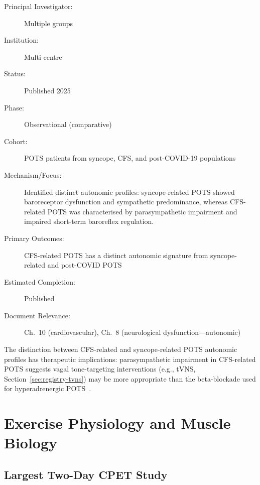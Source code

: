 \begin{description}
    \item[Principal Investigator:] Multiple groups
    \item[Institution:] Multi-centre
    \item[Status:] Published 2025
    \item[Phase:] Observational (comparative)
    \item[Cohort:] POTS patients from syncope, CFS, and post-COVID-19
        populations
    \item[Mechanism/Focus:] Identified distinct autonomic profiles:
        syncope-related POTS showed baroreceptor dysfunction and sympathetic
        predominance, whereas CFS-related POTS was characterised by
        parasympathetic impairment and impaired short-term baroreflex
        regulation.
    \item[Primary Outcomes:] CFS-related POTS has a distinct autonomic
        signature from syncope-related and post-COVID POTS
    \item[Estimated Completion:] Published
    \item[Document Relevance:] Ch.~10 (cardiovascular), Ch.~8 (neurological
        dysfunction---autonomic)
\end{description}

The distinction between CFS-related and syncope-related POTS autonomic
profiles has therapeutic implications: parasympathetic impairment in
CFS-related POTS suggests vagal tone-targeting interventions (e.g., tVNS,
Section~\ref{sec:registry-tvns}) may be more appropriate than the
beta-blockade used for hyperadrenergic
POTS~\cite{POTSautonomicProfiles2025}.

\section{Exercise Physiology and Muscle Biology}
\label{sec:registry-exercise}

\subsection{Largest Two-Day CPET Study}
\label{sec:registry-2day-cpet}

